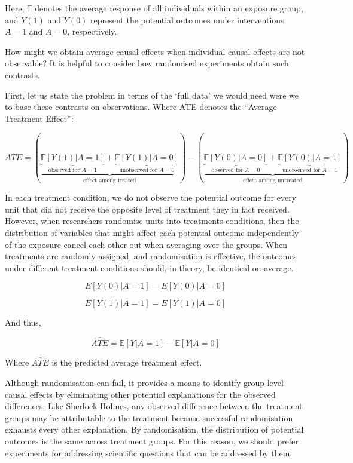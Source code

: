 \documentclass[
  singlecolumn,
  9pt]{article}
\begin{document}
Here, \(\mathbb{E}\) denotes the average response of all individuals
within an exposure group, and \(Y(1)\) and \(Y(0)\) represent the
potential outcomes under interventions \(A = 1\) and \(A = 0\),
respectively.

How might we obtain average causal effects when individual causal
effects are not observable? It is helpful to consider how randomised
experiments obtain such contrasts.

First, let us state the problem in terms of the `full data' we would
need were we to base these contrasts on observations. Where ATE denotes
the ``Average Treatment Effect'':

\[
ATE = \left(\underbrace{\underbrace{\mathbb{E}[Y(1)|A = 1]}_{\text{observed for } A = 1} + \underbrace{\mathbb{E}[Y(1)|A = 0]}_{\text{unobserved for } A = 0}}_{\text{effect among treated}}\right) - \left(\underbrace{\underbrace{\mathbb{E}[Y(0)|A = 0]}_{\text{observed for } A = 0} + \underbrace{\mathbb{E}[Y(0)|A = 1]}_{\text{unobserved for } A = 1}}_{\text{effect among untreated}}\right)
\]

In each treatment condition, we do not observe the potential outcome for
every unit that did not receive the opposite level of treatment they in
fact received. However, when researchers randomise units into treatments
conditions, then the distribution of variables that might affect each
potential outcome independently of the exposure cancel each other out
when averaging over the groups. When treatments are randomly assigned,
and randomisation is effective, the outcomes under different treatment
conditions should, in theory, be identical on average.

\[
 E[Y(0) | A = 1] = E[Y(0) | A = 0] 
\]

\[
E[Y(1) | A = 1] = E[Y(1) | A = 0] 
\]

And thus,

\[
  \widehat{ATE} = \mathbb{E}[Y | A = 1] - \mathbb{E}[Y | A = 0]
\]

Where \(\widehat{ATE}\) is the predicted average treatment effect.

Although randomisation can fail, it provides a means to identify
group-level causal effects by eliminating other potential explanations
for the observed differences. Like Sherlock Holmes, any observed
difference between the treatment groups may be attributable to the
treatment because successful randomisation exhausts every other
explanation. By randomisation, the distribution of potential outcomes is
the same across treatment groups. For this reason, we should prefer
experiments for addressing scientific questions that can be addressed by
them.
\end{document}
